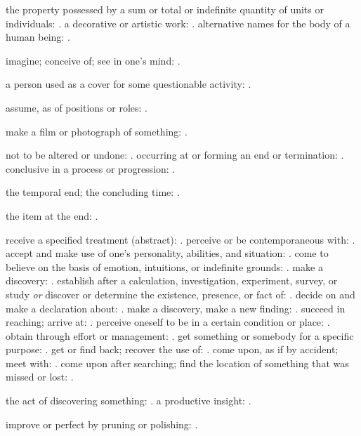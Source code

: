   the property possessed by a sum or total or indefinite quantity of units or individuals: . a decorative or artistic work: . alternative names for the body of a human being: .

  imagine; conceive of; see in one's mind: .

  a person used as a cover for some questionable activity: .

  assume, as of positions or roles: .

  make a film or photograph of something: .

  not to be altered or undone: . occurring at or forming an end or termination: . conclusive in a process or progression: .

  the temporal end; the concluding time: .

  the item at the end: .

  receive a specified treatment (abstract): . perceive or be contemporaneous with: . accept and make use of one's personality, abilities, and situation: . come to believe on the basis of emotion, intuitions, or indefinite grounds: . make a discovery: . establish after a calculation, investigation, experiment, survey, or study \textit{or} discover or determine the existence, presence, or fact of: . decide on and make a declaration about: . make a discovery, make a new finding: . succeed in reaching; arrive at: . perceive oneself to be in a certain condition or place: . obtain through effort or management: . get something or somebody for a specific purpose: . get or find back; recover the use of: . come upon, as if by accident; meet with: . come upon after searching; find the location of something that was missed or lost: .

  the act of discovering something: . a productive insight: .

  improve or perfect by pruning or polishing: .

